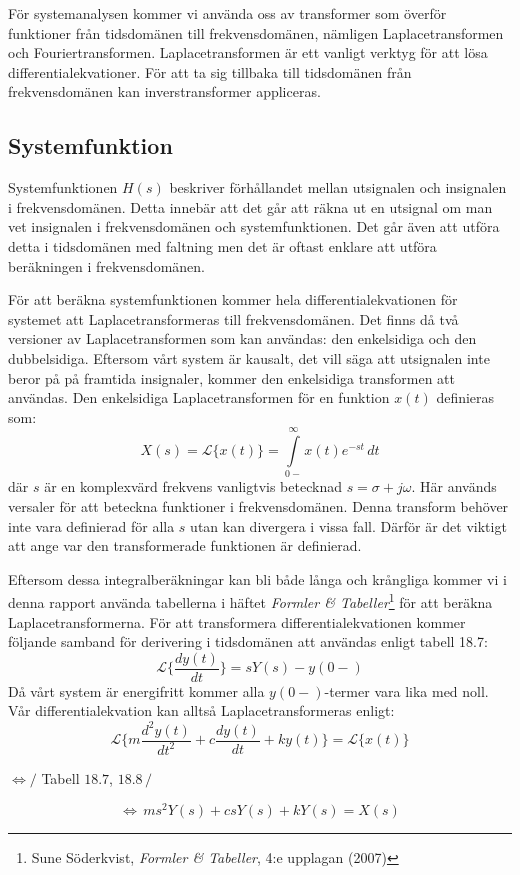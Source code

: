 För systemanalysen kommer vi använda oss av transformer som överför funktioner från tidsdomänen till frekvensdomänen, nämligen Laplacetransformen och Fouriertransformen.
Laplacetransformen är ett vanligt verktyg för att lösa differentialekvationer. För att ta sig tillbaka till tidsdomänen från frekvensdomänen kan inverstransformer appliceras.

\subsection{Systemfunktion}
Systemfunktionen $H(s)$ beskriver förhållandet mellan utsignalen och insignalen i frekvensdomänen. Detta innebär att det går att räkna ut en utsignal om man vet insignalen i frekvensdomänen och systemfunktionen. 
Det går även att utföra detta i tidsdomänen med faltning men det är oftast enklare att utföra beräkningen i frekvensdomänen.

För att beräkna systemfunktionen kommer hela differentialekvationen för systemet att Laplacetransformeras till frekvensdomänen. Det finns då två versioner av Laplacetransformen som kan användas: den enkelsidiga och den dubbelsidiga.
Eftersom vårt system är kausalt, det vill säga att utsignalen inte beror på på framtida insignaler, kommer den enkelsidiga transformen att användas.
Den enkelsidiga Laplacetransformen för en funktion $x(t)$ definieras som:
$$X(s) = \mathcal{L}\big\{x(t)\big\} = \int\limits_{0-}^{\infty} x(t)e^{-st}\,dt$$
där $s$ är en komplexvärd frekvens vanligtvis betecknad $s=\sigma+j\omega$.
Här används versaler för att beteckna funktioner i frekvensdomänen.
Denna transform behöver inte vara definierad för alla $s$ utan kan divergera i vissa fall. Därför är det viktigt att ange var den transformerade funktionen är definierad. 

Eftersom dessa integralberäkningar kan bli både långa och krångliga kommer vi i denna rapport använda tabellerna i häftet \textit{Formler \& Tabeller}\footnote{Sune Söderkvist, \textit{Formler \& Tabeller}, 4:e upplagan (2007)} för att beräkna Laplacetransformerna.
För att transformera differentialekvationen kommer följande samband för derivering i tidsdomänen att användas enligt tabell 18.7:
$$\mathcal{L}\bigg\{\frac{dy(t)}{dt}\bigg\} = sY(s)-y(0-)$$
Då vårt system är energifritt kommer alla $y(0-)$-termer vara lika med noll. Vår differentialekvation kan alltså Laplacetransformeras enligt:
$$ \mathcal{L}\bigg\{m\displaystyle\frac{d^2y(t)}{dt^2} + c\displaystyle\frac{dy(t)}{dt} + ky(t)\bigg\}= \mathcal{L}\bigg\{x(t)\bigg\} $$
\begin{center}$ \Longleftrightarrow \bigg/$ Tabell $18.7$, $18.8\,\bigg/$ \end{center}
$$ \Longleftrightarrow\, ms^2Y(s)+csY(s)+kY(s)=X(s)$$

